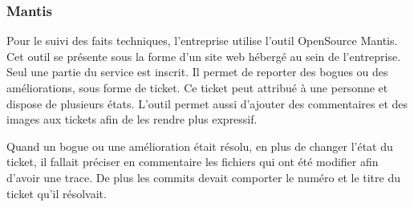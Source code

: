 \documentclass[12pt,a4paper]{article}
\begin{document}
\subsubsection{Mantis}
Pour le suivi des faits techniques, l'entreprise utilise l'outil OpenSource Mantis. Cet outil se présente sous la forme d'un site web hébergé au sein de l'entreprise. Seul une partie du service est inscrit. Il permet de reporter des bogues ou des améliorations, sous forme de ticket. Ce ticket peut attribué à une personne et dispose de plusieurs états. L'outil permet aussi d'ajouter des commentaires et des images aux tickets afin de les rendre plus expressif.\par 
Quand un bogue ou une amélioration était résolu, en plus de changer l'état du ticket, il fallait préciser en commentaire les fichiers qui ont été modifier afin d'avoir une trace. De plus les commits devait comporter le numéro et le titre du ticket qu'il résolvait.\par

\newpage
\end{document}
